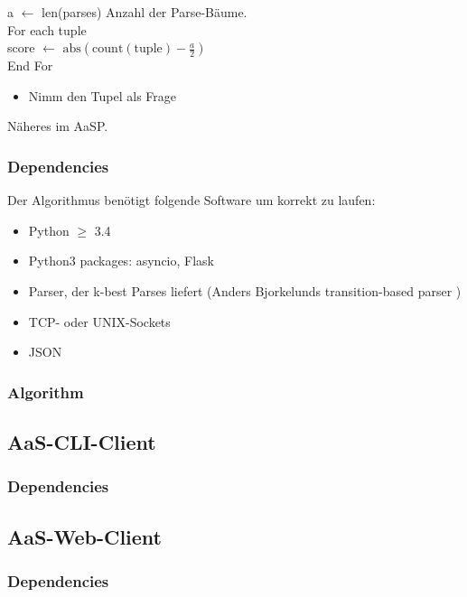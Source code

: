 \documentclass{scrartcl}
\begin{document}
        \indent\indent\indent\indent\indent\indent a $\gets$ len(parses) Anzahl der Parse-Bäume. \\
        \indent\indent\indent\indent\indent\indent For each tuple \\
       \indent\indent\indent\indent\indent\indent\indent score $\gets$ $\mathrm{abs}(\mathrm{count(tuple)} - \frac{a}{2})$ \\
        \indent\indent\indent\indent\indent\indent End For

    \begin{itemize}
        \item Nimm den Tupel als Frage
    \end{itemize}
Näheres im AaSP.

\subsubsection{Dependencies}
\label{ssub:Server-Dependencies}
Der Algorithmus benötigt folgende Software um korrekt zu laufen:
    \begin{itemize}
        \item Python $\geq$ 3.4 
        \item Python3 packages: asyncio, Flask
        \item Parser, der k-best Parses liefert (Anders Bjorkelunds transition-based parser )
        \item TCP- oder UNIX-Sockets
        \item JSON
    \end{itemize}

\subsubsection{Algorithm}
\label{ssub:Algorithm}

\subsection{AaS-CLI-Client}
\label{sub:AaS-CLI-Client}

\subsubsection{Dependencies}
\label{ssub:CLI-Client-Dependencies}

\subsection{AaS-Web-Client}
\label{sub:AaS-Web-Client}

\subsubsection{Dependencies}
\label{ssub:Web-Client-Dependencies}
\end{document}
